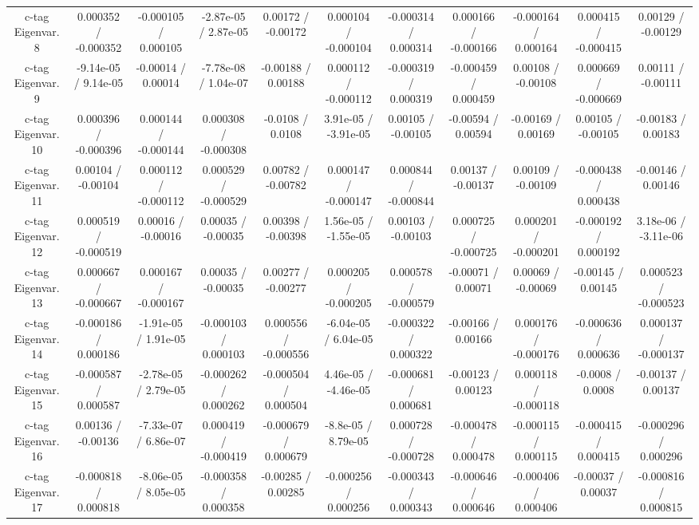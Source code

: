 \begin{table}[htbp]
\begin{center}
\begin{tabular}{|c|c|c|c|c|c|c|c|c|c|c|}
  c-tag Eigenvar. 8 & 0.000352 / -0.000352 & -0.000105 / 0.000105 & -2.87e-05 / 2.87e-05 & 0.00172 / -0.00172 & 0.000104 / -0.000104 & -0.000314 / 0.000314 & 0.000166 / -0.000166 & -0.000164 / 0.000164 & 0.000415 / -0.000415 & 0.00129 / -0.00129 \\ 
  c-tag Eigenvar. 9 & -9.14e-05 / 9.14e-05 & -0.00014 / 0.00014 & -7.78e-08 / 1.04e-07 & -0.00188 / 0.00188 & 0.000112 / -0.000112 & -0.000319 / 0.000319 & -0.000459 / 0.000459 & 0.00108 / -0.00108 & 0.000669 / -0.000669 & 0.00111 / -0.00111 \\ 
  c-tag Eigenvar. 10 & 0.000396 / -0.000396 & 0.000144 / -0.000144 & 0.000308 / -0.000308 & -0.0108 / 0.0108 & 3.91e-05 / -3.91e-05 & 0.00105 / -0.00105 & -0.00594 / 0.00594 & -0.00169 / 0.00169 & 0.00105 / -0.00105 & -0.00183 / 0.00183 \\ 
  c-tag Eigenvar. 11 & 0.00104 / -0.00104 & 0.000112 / -0.000112 & 0.000529 / -0.000529 & 0.00782 / -0.00782 & 0.000147 / -0.000147 & 0.000844 / -0.000844 & 0.00137 / -0.00137 & 0.00109 / -0.00109 & -0.000438 / 0.000438 & -0.00146 / 0.00146 \\ 
  c-tag Eigenvar. 12 & 0.000519 / -0.000519 & 0.00016 / -0.00016 & 0.00035 / -0.00035 & 0.00398 / -0.00398 & 1.56e-05 / -1.55e-05 & 0.00103 / -0.00103 & 0.000725 / -0.000725 & 0.000201 / -0.000201 & -0.000192 / 0.000192 & 3.18e-06 / -3.11e-06 \\ 
  c-tag Eigenvar. 13 & 0.000667 / -0.000667 & 0.000167 / -0.000167 & 0.00035 / -0.00035 & 0.00277 / -0.00277 & 0.000205 / -0.000205 & 0.000578 / -0.000579 & -0.00071 / 0.00071 & 0.00069 / -0.00069 & -0.00145 / 0.00145 & 0.000523 / -0.000523 \\ 
  c-tag Eigenvar. 14 & -0.000186 / 0.000186 & -1.91e-05 / 1.91e-05 & -0.000103 / 0.000103 & 0.000556 / -0.000556 & -6.04e-05 / 6.04e-05 & -0.000322 / 0.000322 & -0.00166 / 0.00166 & 0.000176 / -0.000176 & -0.000636 / 0.000636 & 0.000137 / -0.000137 \\ 
  c-tag Eigenvar. 15 & -0.000587 / 0.000587 & -2.78e-05 / 2.79e-05 & -0.000262 / 0.000262 & -0.000504 / 0.000504 & 4.46e-05 / -4.46e-05 & -0.000681 / 0.000681 & -0.00123 / 0.00123 & 0.000118 / -0.000118 & -0.0008 / 0.0008 & -0.00137 / 0.00137 \\ 
  c-tag Eigenvar. 16 & 0.00136 / -0.00136 & -7.33e-07 / 6.86e-07 & 0.000419 / -0.000419 & -0.000679 / 0.000679 & -8.8e-05 / 8.79e-05 & 0.000728 / -0.000728 & -0.000478 / 0.000478 & -0.000115 / 0.000115 & -0.000415 / 0.000415 & -0.000296 / 0.000296 \\ 
  c-tag Eigenvar. 17 & -0.000818 / 0.000818 & -8.06e-05 / 8.05e-05 & -0.000358 / 0.000358 & -0.00285 / 0.00285 & -0.000256 / 0.000256 & -0.000343 / 0.000343 & -0.000646 / 0.000646 & -0.000406 / 0.000406 & -0.00037 / 0.00037 & -0.000816 / 0.000815 \\ 

\end{tabular}
\end{center}
\end{table}
